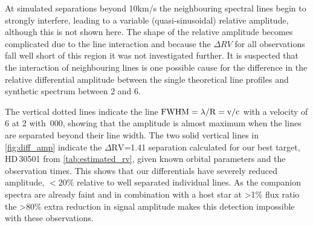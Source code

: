 At simulated separations beyond 10km/s the neighbouring spectral lines begin to strongly interfere, leading to a variable (quasi-sinusoidal) relative amplitude, although this is not shown here.
The shape of the relative amplitude becomes complicated due to the line interaction and because the \(\Delta {RV}\) for all observations fall well short of this region it was not investigated further.
It is suspected that the interaction of neighbouring lines is one possible cause for the difference in the relative differential amplitude between the single theoretical line profiles and synthetic spectrum between 2 and 6\kmps{}.

The vertical dotted lines indicate the line \(\rm {\textrm{FWHM}} = \lambda /\textrm{R}=v /c\) with a velocity of 6\kmps{} at 2\um{} with \,000, showing that the amplitude is almost maximum when the lines are separated beyond their line width.
The two solid vertical lines in \cref{fig:diff_amp} indicate the \(\Delta \textrm{RV}\)=1.41\kmps{} separation calculated for our best target, {HD\,30501} from \cref{tab:estimated_rv}, given known orbital parameters and the observation times.
This shows that our differentials have severely reduced amplitude, \(<20\%\) relative to well separated individual lines.
As the companion spectra are already faint and in combination with a host star at >1\% flux ratio the >80\% extra reduction in signal amplitude makes this detection impossible with these observations.

